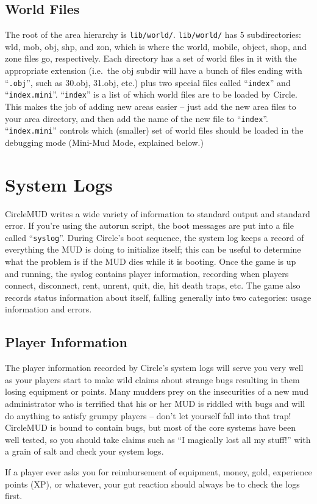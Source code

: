\documentclass[11pt]{article}
\begin{document}
\subsection{World Files}
The root of the area hierarchy is \texttt{lib/world/}.  \texttt{lib/world/} has 5 subdirectories: wld, mob, obj, shp, and zon, which is where the world, mobile, object, shop, and zone files go, respectively.  Each directory has a set of world files in it with the appropriate extension (i.e.\ the obj subdir will have a bunch of files ending with ``\texttt{.obj}'', such as 30.obj, 31.obj, etc.) plus two special files called ``\texttt{index}'' and ``\texttt{index.mini}''.  ``\texttt{index}'' is a list of which world files are to be loaded by Circle.  This makes the job of adding new areas easier -- just add the new area files to
your area directory, and then add the name of the new file to ``\texttt{index}''.  ``\texttt{index.mini}'' controls which (smaller) set of world files should be loaded in the debugging mode (Mini-Mud Mode, explained below.)

\section{System Logs}
CircleMUD writes a wide variety of information to standard output and standard error.  If you're using the autorun script, the boot messages are put into a file called ``\texttt{syslog}''.  During Circle's boot sequence, the system log keeps a record of everything the MUD is doing to initialize itself; this can be useful to determine what the problem is if the MUD dies while it is booting.  Once the game is up and running, the syslog contains player information, recording when players connect, disconnect, rent, unrent, quit, die, hit death traps, etc.  The game also records status information about itself, falling generally into two categories: usage information and errors.

\subsection{Player Information}
The player information recorded by Circle's system logs will serve you very well as your players start to make wild claims about strange bugs resulting in them losing equipment or points.  Many mudders prey on the insecurities of a new mud administrator who is terrified that his or her MUD is riddled with bugs and will do anything to satisfy grumpy players -- don't let yourself fall into that trap!  CircleMUD is bound to contain bugs, but most of the core systems have been well tested, so you should take claims such as ``I magically lost all my stuff!'' with a grain of salt and check your system logs.
\par
If a player ever asks you for reimbursement of equipment, money, gold, experience points (XP), or whatever, your gut reaction should always be to check the logs first.
\end{document}
